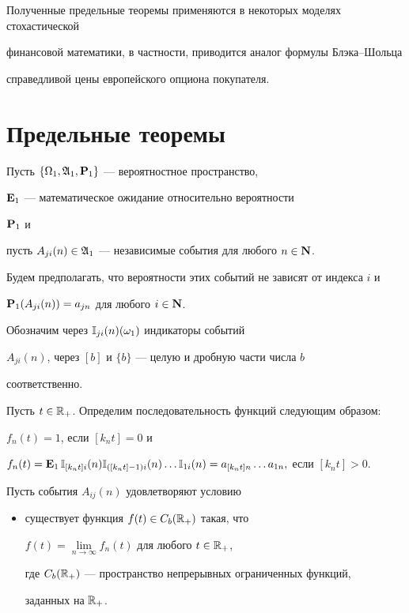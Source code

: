 Полученные предельные теоремы применяются в некоторых моделях стохастической


финансовой математики, в частности, приводится аналог формулы Блэка--Шольца


справедливой цены европейского опциона покупателя.








\section{Предельные теоремы}





Пусть $\{\Omega_1,\frak A_1 ,\bold P_1\}$ --- вероятностное пространство,


${\bold E}_1$ --- математическое ожидание относительно вероятности


${\bold P}_1$ и


пусть $A_{ji}(n)\in\frak A_1$ --- независимые события для любого $n\in\bold N$.


Будем предполагать, что вероятности этих событий не зависят от индекса $i$ и


$\bold P_1(A_{ji}(n))=a_{jn}$ для любого $i\in\bold N$.


Обозначим через $\Bbb I_{ji}(n)(\omega_1)$ индикаторы событий


$A_{ji}(n)$, через $[b]$ и $\{b\}$ --- целую и дробную части числа $b$


соответственно.





Пусть $t\in \Bbb R_+ $. Определим последовательность функций следующим образом:


$f_n(t)=1$, если $[k_nt]=0$ и


$ f_n(t)=\E_1\,\IND_{[k_nt]i}(n) \IND_{([k_nt]-1)i}(n)\dotsc \IND_{1i}(n)


=a_{[k_nt]n}\dotsc a_{1n},$ если $[k_nt]>0$.





Пусть события $A_{ij}(n)$ удовлетворяют условию


\begin{itemize}


\item[(1)] существует функция $f(t)\in C_{b}(\Bbb R_+)$ такая, что


$f(t)= \lim \limits_{n\rightarrow \infty } f_{n}(t)$ для любого $t\in\Bbb R_+ $,


где $C_{b}(\Bbb R_+)$ --- пространство непрерывных ограниченных функций, 


заданных на $\Bbb R_+$.


\end{itemize}





